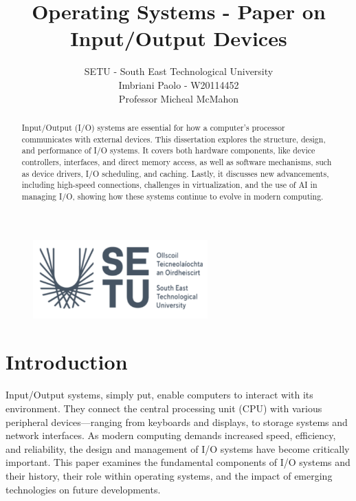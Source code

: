 \documentclass[a4paper]{article}
\title{Operating Systems - Paper on Input/Output Devices}
\author{SETU - South East Technological University\\Imbriani Paolo - W20114452\\Professor Micheal McMahon}
\begin{document}
\begin{figure}
    \centering
    \includegraphics[width=0.6\textwidth]{SETU.png}
    \label{fig:centered-image}
\end{figure}

\maketitle 

\begin{abstract}
    Input/Output (I/O) systems are essential for how a computer’s processor communicates with 
    external devices. This dissertation explores the structure, design, and performance of I/O systems. 
    It covers both hardware components, like device controllers, interfaces, and direct memory access, 
    as well as software mechanisms, such as device drivers, I/O scheduling, and caching. Lastly, 
    it discusses new advancements, including high-speed connections, challenges in virtualization,
    and the use of AI in managing I/O, showing how these systems continue to evolve in modern computing.
\end{abstract}


\pagebreak

\tableofcontents

\pagebreak

\section*{Introduction}

Input/Output systems, simply put, enable computers to interact with its environment.
They connect the central processing unit (CPU) with various peripheral devices—ranging from 
keyboards and displays, to storage systems and network interfaces. As modern computing demands 
increased speed, efficiency, and reliability, the design and management of I/O systems have become 
critically important. This paper examines the fundamental components of I/O systems and their history, their role 
within operating systems, and the impact of emerging technologies on future developments.
\end{document}
